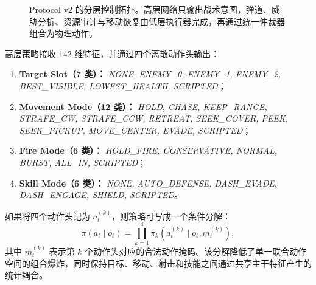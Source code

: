 \documentclass[UTF8,a4paper,11pt]{ctexart}
\begin{document}
\begin{figure}[H]
{%
    }
    \caption{Protocol v2 的分层控制拓扑。高层网络只输出战术意图，弹道、威胁分析、资源审计与移动恢复由低层执行器完成，再通过统一仲裁器组合为物理动作。}
    \label{fig:protocol_v2_flow}
\end{figure}

高层策略接收 142 维特征，并通过四个离散动作头输出：
\begin{sloppypar}
\begin{enumerate}
    \item \textbf{Target Slot（7 类）：}
    \textit{NONE, ENEMY\_0, ENEMY\_1, ENEMY\_2, BEST\_VISIBLE, LOWEST\_HEALTH, SCRIPTED}；
    \item \textbf{Movement Mode（12 类）：}
    \textit{HOLD, CHASE, KEEP\_RANGE, STRAFE\_CW, STRAFE\_CCW, RETREAT, SEEK\_COVER, PEEK, SEEK\_PICKUP, MOVE\_CENTER, EVADE, SCRIPTED}；
    \item \textbf{Fire Mode（6 类）：}
    \textit{HOLD\_FIRE, CONSERVATIVE, NORMAL, BURST, ALL\_IN, SCRIPTED}；
    \item \textbf{Skill Mode（6 类）：}
    \textit{NONE, AUTO\_DEFENSE, DASH\_EVADE, DASH\_ENGAGE, SHIELD, SCRIPTED}。
\end{enumerate}
\end{sloppypar}

如果将四个动作头记为 $a_t^{(k)}$，则策略可写成一个条件分解：
\begin{equation}
    \pi(a_t\mid o_t)
    =
    \prod_{k=1}^{4}
    \pi_k\!\left(a_t^{(k)}\mid o_t,m_t^{(k)}\right),
\end{equation}
其中 $m_t^{(k)}$ 表示第 $k$ 个动作头对应的合法动作掩码。该分解降低了单一联合动作空间的组合爆炸，同时保持目标、移动、射击和技能之间通过共享主干特征产生的统计耦合。
\end{document}
